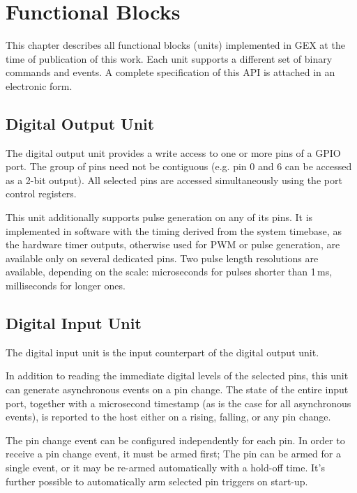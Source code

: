 \chapter{Functional Blocks}

This chapter describes all functional blocks (units) implemented in GEX at the time of publication of this work. Each unit supports a different set of binary commands and events. A complete specification of this API is attached in an electronic form. 


\section{Digital Output Unit}

The digital output unit provides a write access to one or more pins of a GPIO port. The group of pins need not be contiguous (e.g. pin 0 and 6 can be accessed as a 2-bit output). All selected pins are accessed simultaneously using the port control registers. 

This unit additionally supports pulse generation on any of its pins. It is implemented in software with the timing derived from the system timebase, as the hardware timer outputs, otherwise used for PWM or pulse generation, are available only on several dedicated pins. Two pulse length resolutions are available, depending on the scale: microseconds for pulses shorter than 1\,ms, milliseconds for longer ones.



\section{Digital Input Unit}

The digital input unit is the input counterpart of the digital output unit. 

In addition to reading the immediate digital levels of the selected pins, this unit can generate asynchronous events on a pin change. The state of the entire input port, together with a microsecond timestamp (as is the case for all asynchronous events), is reported to the host either on a rising, falling, or any pin change. 

The pin change event can be configured independently for each pin. In order to receive a pin change event, it must be armed first; The pin can be armed for a single event, or it may be re-armed automatically with a hold-off time. It's further possible to automatically arm selected pin triggers on start-up.


